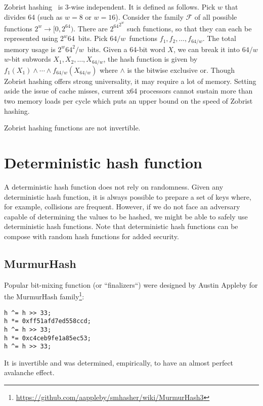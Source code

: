 \documentclass{article}
\newcommand\xor{\wedge}
\begin{document}
Zobrist hashing~\cite{zobrist1970, zobrist1990new,thorup2012tabulation,Patrascu:2012:PST:2220357.2220361} is 3-wise independent. It is defined as follows. Pick $w$ that divides 64 (such as $w=8$ or $w=16$).
Consider the family $\mathcal{F}$ of all possible functions $2^w \to [0,2^64)$. There are ${2^64}^{2^w}$ such functions, so that they can each be represented using $2^w 64$~bits. Pick $64/w$~functions $f_1, f_2, \ldots, f_{64/w}$. The total memory usage is $2^w 64^2/w$~bits. 
Given a 64-bit word $X$, we can break it into $64/w$ $w$-bit subwords $X_1,X_2, \ldots, X_{64/w}$, 
the hash function is given by $ f_1(X_1) \xor \cdots \xor  f_{64/w}(X_{64/w})$ where $\xor{}$ is the bitwise exclusive or. Though Zobrist hashing offers strong universality, it may require a lot of memory. Setting aside the issue of cache misses, current x64 processors cannot sustain more than two memory loads per cycle which puts an upper bound on the speed of Zobrist hashing.

Zobrist hashing functions are not invertible.

\section{Deterministic hash function}

A deterministic hash function does not rely on randomness.
Given any deterministic hash function, it is always possible to prepare a set of keys where, for example, collisions are frequent. However, if we do not face an adversary capable of determining the values to be hashed, we might be able to  safely use deterministic hash functions. Note that deterministic hash functions can be compose with random hash functions for added security.

\subsection{MurmurHash}

Popular bit-mixing function (or ``finalizers``) were designed by Austin	Appleby for the MurmurHash family\footnote{\url{https://github.com/aappleby/smhasher/wiki/MurmurHash3}}:


\begin{lstlisting}
h ^= h >> 33;
h *= 0xff51afd7ed558ccd;
h ^= h >> 33;
h *= 0xc4ceb9fe1a85ec53;
h ^= h >> 33;
\end{lstlisting}

It is invertible and was determined, empirically, to have an almost perfect avalanche effect.
\end{document}
